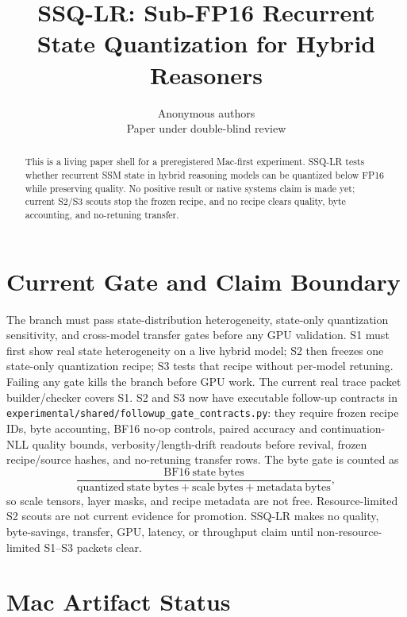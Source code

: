 \documentclass{article}
\title{SSQ-LR: Sub-FP16 Recurrent State Quantization for Hybrid Reasoners}
\author{Anonymous authors\\Paper under double-blind review}
\begin{document}
\maketitle

\begin{abstract}
This is a living paper shell for a preregistered Mac-first experiment. SSQ-LR
tests whether recurrent SSM state in hybrid reasoning models can be quantized
below FP16 while preserving quality. No positive result or native systems claim
is made yet; current S2/S3 scouts stop the frozen recipe, and no recipe clears
quality, byte accounting, and no-retuning transfer.
\end{abstract}

\section{Current Gate and Claim Boundary}

The branch must pass state-distribution heterogeneity, state-only quantization
sensitivity, and cross-model transfer gates before any GPU validation.
S1 must first show real state heterogeneity on a live hybrid model; S2 then
freezes one state-only quantization recipe; S3 tests that recipe without
per-model retuning. Failing any gate kills the branch before GPU work.
The current real trace packet builder/checker covers S1. S2 and S3 now have
executable follow-up contracts in \texttt{experimental/shared/followup\_gate\_contracts.py}:
they require frozen recipe IDs, byte accounting, BF16 no-op controls, paired
accuracy and continuation-NLL quality bounds, verbosity/length-drift readouts
before revival, frozen recipe/source hashes, and no-retuning transfer rows.
The byte gate is counted as
\[
\frac{\mathrm{BF16\ state\ bytes}}{\mathrm{quantized\ state\ bytes} + \mathrm{scale\ bytes} + \mathrm{metadata\ bytes}},
\]
so scale tensors, layer masks, and recipe metadata are not free.
Resource-limited S2 scouts are not current evidence
for promotion. SSQ-LR makes no quality, byte-savings, transfer, GPU, latency, or
throughput claim until non-resource-limited S1--S3 packets clear.

\section{Mac Artifact Status}
\end{document}
